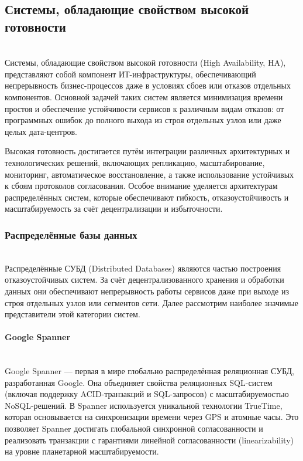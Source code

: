 \subsection{Системы, обладающие свойством высокой готовности} ~\\

Системы, обладающие свойством высокой готовности (High Availability, HA), представляют собой компонент ИТ-инфраструктуры, обеспечивающий непрерывность бизнес-процессов даже в условиях сбоев или отказов отдельных компонентов. Основной задачей таких систем является минимизация времени простоя и обеспечение устойчивости сервисов к различным видам отказов: от программных ошибок до полного выхода из строя отдельных узлов или даже целых дата-центров.

Высокая готовность достигается путём интеграции различных архитектурных и технологических решений, включающих репликацию, масштабирование, мониторинг, автоматическое восстановление, а также использование устойчивых к сбоям протоколов согласования. Особое внимание уделяется архитектурам распределённых систем, которые обеспечивают гибкость, отказоустойчивость и масштабируемость за счёт децентрализации и избыточности.

\subsubsection{Распределённые базы данных} ~\\

Распределённые СУБД (Distributed Databases) являются частью построения отказоустойчивых систем. За счёт децентрализованного хранения и обработки данных они обеспечивают непрерывность работы сервисов даже при выходе из строя отдельных узлов или сегментов сети. Далее рассмотрим наиболее значимые представители этой категории систем. \autocite{OszuValduriez}

\paragraph{Google Spanner} ~\\

Google Spanner — первая в мире глобально распределённая реляционная СУБД, разработанная Google. Она объединяет свойства реляционных SQL-систем (включая поддержку ACID-транзакций и SQL-запросов) с масштабируемостью NoSQL-решений. В Spanner используется уникальной технологии TrueTime, которая основывается на синхронизации времени через GPS и атомные часы. Это позволяет Spanner достигать глобальной синхронной согласованности и реализовать транзакции с гарантиями линейной согласованности (linearizability) на уровне планетарной масштабируемости. \autocite{Kleppmann}

